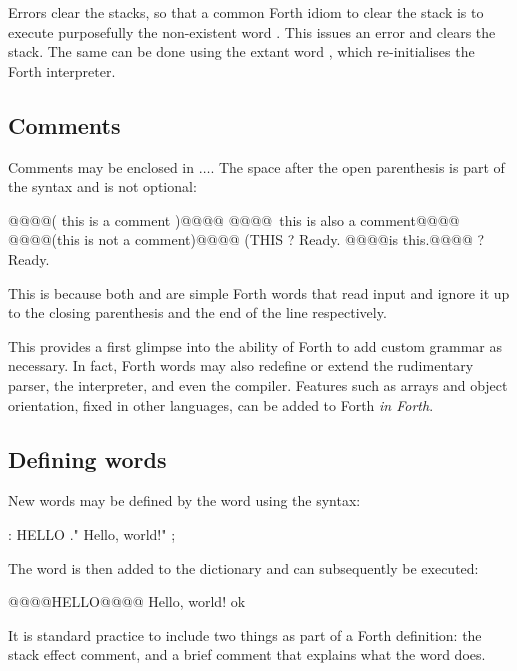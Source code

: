 Errors clear the stacks, so that a common Forth idiom to clear the stack is to
execute purposefully the non-existent word . This issues an error and
clears the stack. The same can be done using the extant word , which
re-initialises the Forth interpreter.


\subsection{Comments}

Comments may be enclosed in \cftin{(\space}$\dots$\cftin{\space)}. The space
after the open parenthesis is part of the syntax and is not optional:

\begin{intrcode}
@@@@( this is a comment )@@@@
@@@@\ this is also a comment@@@@
@@@@(this is not a comment)@@@@  (THIS  ? Ready.
@@@@\neither is this.@@@@  \NEITHER  ? Ready.
\end{intrcode}

\noindent This is because both \fw{(} and \fw{\textbackslash} are simple Forth words that
read input and ignore it up to the closing parenthesis and the end of the line
respectively.

This provides a first glimpse into the ability of Forth to add custom grammar
as necessary. In fact, Forth words may also redefine or extend the rudimentary
parser, the interpreter, and even the compiler. Features such as arrays and
object orientation, fixed in other languages, can be added to Forth {\em in
  Forth}.

\subsection{Defining words}

New words may be defined by the \fw{:} word using the  syntax:

\begin{forthcode}
: HELLO ." Hello, world!" ;
\end{forthcode}

\noindent The word  is then added to the dictionary and can subsequently be
executed:

\begin{intrcode}
@@@@HELLO@@@@ Hello, world! ok
\end{intrcode}

\noindent It is standard practice to include two things as part of a Forth definition:
the \gls{stack effect comment}, and a brief comment that explains what the word does. 

